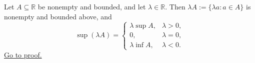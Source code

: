 \begin{theorem}
\label{thm:supremum-dilation}
Let $A\subseteq\mathbb{R}$ be nonempty and bounded, and let
$\lambda\in\mathbb{R}$.  Then $\lambda A:=\{\lambda a:a\in A\}$ is nonempty
and bounded above, and
\[
  \sup(\lambda A)=
  \begin{cases}
    \lambda\sup A, & \lambda>0,\\
    0, & \lambda=0,\\
    \lambda\inf A, & \lambda<0.
  \end{cases}
\]
\hyperref[prf:supremum-dilation]{Go to proof.}
\end{theorem}